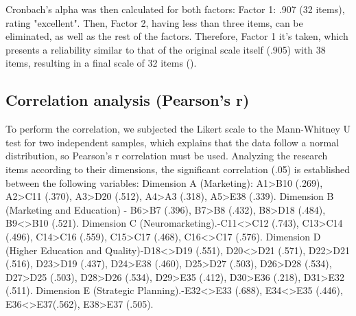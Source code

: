 \documentclass[english]{textolivre}
\begin{document}
\begingroup
\setlength\tabcolsep{2pt} %
\begin{table}[h!]
\centering
\caption{\textit{Items integrated in each factor}}
\label{Table03}
\end{table}
\endgroup

Cronbach's alpha was then calculated for both factors: Factor 1: .907 (32 items), rating "excellent". Then, Factor 2, having less than three items, can be eliminated, as well as the rest of the factors. Therefore, Factor 1 it’s taken, which presents a reliability similar to that of the original scale itself (.905) with 38 items, resulting in a final scale of 32 items ().

\subsection{Correlation analysis (Pearson's r)}

To perform the correlation, we subjected the Likert scale to the Mann-Whitney U test for two independent samples, which explains that the data follow a normal distribution, so Pearson's r correlation must be used. Analyzing the research items according to their dimensions, the significant correlation (.05) is established between the following variables: Dimension A (Marketing): A1>B10 (.269), A2>C11 (.370), A3>D20 (.512), A4>A3 (.318), A5>E38 (.339). Dimension B (Marketing and Education) - B6>B7 (.396), B7>B8 (.432), B8>D18 (.484), B9<>B10 (.521). Dimension C (Neuromarketing).-C11<>C12 (.743), C13>C14 (.496), C14>C16 (.559), C15>C17 (.468), C16<>C17 (.576). Dimension D (Higher Education and Quality)-D18<>D19 (.551), D20<>D21 (.571), D22>D21 (.516), D23>D19 (.437), D24>E38 (.460), D25>D27 (.503), D26>D28 (.534), D27>D25 (.503), D28>D26 (.534), D29>E35 (.412), D30>E36 (.218), D31>E32 (.511). Dimension E (Strategic Planning).-E32<>E33 (.688), E34<>E35 (.446), E36<>E37(.562), E38>E37 (.505).
\end{document}
